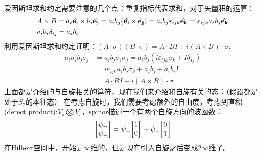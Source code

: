 \documentclass[UTF8]{article}
\numberwithin{equation}{section}
\begin{document}
爱因斯坦求和约定需要注意的几个点：重复指标代表求和，对于矢量积的运算：
\begin{align*}
     & A\times B = a_i\vu{e_i}\times b_j \vu{e_j}=a_ib_j(\vu{e_i}\times\vu{e_j})=a_ib_j\varepsilon_{ijk}\vu{e_k}=\varepsilon_{ijk}a_ib_j\vu{e_k}
    \\  &a_ib_j\delta_{ij}=a_ib_i
\end{align*}
利用爱因斯坦求和约定证明：$(A\cdot\sigma)(B\cdot \sigma)=A\cdot B I+i(A\times B)\cdot \sigma$:
\begin{align*}
    a_i\sigma_i b_j\sigma_j & =a_ib_j\sigma_i\sigma_j=a_ib_j(i\varepsilon_{ijk}\sigma_k+I\delta_{ij}) \\
                            & =i\varepsilon_{ijk}a_ib_j\sigma_k+a_ib_j+a_ib_i I                       \\
                            & =A\cdot B I+i(A\times B)\cdot \sigma
\end{align*}
上面都是介绍的与自旋相关的算符，现在我们来介绍和自旋有关的态：（假设都是处于$S_z$的本征态）
在考虑自旋时，我们需要考虑额外的自由度，考虑到直积(derect product):$
    V_o\bigotimes V_s$，spinor描述一个有两个自旋方向的波函数：
\begin{align*}
    \mqty[\psi_+ \\ \psi_-]=\psi_+ \mqty[1\\0]+\psi_- \mqty[0\\1]
\end{align*}
在Hilbert空间中，开始是$\infty$维的，但是现在引入自旋之后变成$2\infty$维了。
\end{document}
